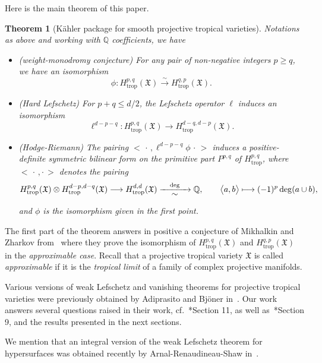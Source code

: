 \documentclass[11pt]{amsart}
\newtheorem{thm}{Theorem}[section]
\theoremstyle{definition}
\numberwithin{equation}{section}
\newcommand{\cf}[1]{cf.}
\renewcommand{\~}{\widetilde}
\newcommand{\Q}{\mathbb{Q}}
\newcommand{\ccdot}{\,\cdot\,}
\newcommand{\rdot}{\cdot\,}
\newcommand{\trop}{\mathrm{trop}} %
\newcommand{\X}{\mathfrak X}
\begin{document}
\medskip

Here is the main theorem of this paper.

\begin{thm}[K\"ahler package for smooth projective tropical varieties]\label{thm:main2} Notations as above and working with $\Q$ coefficients, we have
\begin{itemize}
\item \emph{(weight-monodromy conjecture)} For any pair of non-negative integers $p\geq q$, we have an isomorphism
\[\phi\colon H_{\trop}^{p,q}(\X) \xrightarrow{\sim} H_{\trop}^{q,p}(\X).\]

\item \emph{(Hard Lefschetz)} For $p+q \leq d/2$, the Lefschetz operator $\ell$ induces an isomorphism
\[\ell^{d- p-q}\colon H_{\trop}^{p,q}(\X) \to H^{d-q, d-p}_{\trop}(\X).\]

\item \emph{(Hodge-Riemann)} The pairing $\bigl< \ccdot , \ell^{d-p-q} \phi\ccdot \bigr>$ induces a positive-definite symmetric bilinear form on the primitive part $P^{p,q}$ of $H_{\trop}^{p,q}$, where $\bigl< \ccdot,\rdot \bigr>$ denotes the pairing
\begin{equation*}
H^{p,q}_\trop(\X) \otimes H_\trop^{d-p,d-q}(\X) \longrightarrow H_\trop^{d,d}(\X) \xrightarrow[\raisebox{3pt}{$\sim$}]{\quad\deg\quad} \Q, \qquad
 \bigl< a,b \bigr> \longmapsto  (-1)^p\deg(a \cup b),
\end{equation*}
and $\phi$ is the isomorphism given in the first point.
\end{itemize}
\end{thm}

The first part of the theorem answers in positive a conjecture of Mikhalkin and Zharkov from~\cite{MZ} where they prove the isomorphism of $H^{p,q}_\trop(\X)$ and $H^{q,p}_\trop(\X)$ in the \emph{approximable case}. Recall that a projective tropical variety $\X$ is called \emph{approximable} if it is the \emph{tropical limit} of  a family of complex projective manifolds.

\medskip

Various versions of weak Lefschetz and vanishing theorems for projective tropical varieties were previously obtained by Adiprasito and Bj\"oner in~\cite{AB}. Our work answers several questions raised in their work, \cf.~\cite{AB}*{Section 11}, as well as~\cite{AB}*{Section 9}, and the results presented in the next sections.

\smallskip
We mention that an integral version of the weak Lefschetz theorem for hypersurfaces was obtained recently by Arnal-Renaudineau-Shaw in~\cite{ARS}.
\end{document}
